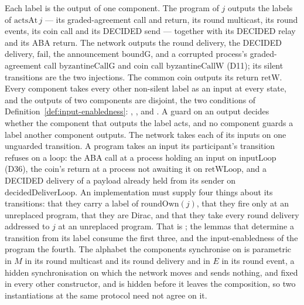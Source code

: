 \begin{definition}
  Each label is the output of one component.
  The program of $j$ outputs the labels of $\mathrm{actsAt}\,j$ --- its graded-agreement call and return, its round multicast, its round events, its coin call and its DECIDED send --- together with its DECIDED relay and its ABA return.
  The network outputs the round delivery, the DECIDED delivery, $\mathrm{fail}$, the announcement $\mathrm{boundG}$, and a corrupted process's graded-agreement call $\mathrm{byzantineCallG}$ and coin call $\mathrm{byzantineCallW}$ (D11); its silent transitions are the two injections.
  The common coin outputs its return $\mathrm{retW}$.
  Every component takes every other non-silent label as an input at every state, and the outputs of two components are disjoint, the two conditions of Definition~\ref{def:input-enabledness}: , ,  and .
  A guard on an output decides whether the component that outputs the label acts, and no component guards a label another component outputs.
  The network takes each of its inputs on one unguarded transition.
  A program takes an input its participant's transition refuses on a loop: the ABA call at a process holding an input on $\mathrm{inputLoop}$ (D36), the coin's return at a process not awaiting it on $\mathrm{retWLoop}$, and a DECIDED delivery of a payload already held from its sender on $\mathrm{decidedDeliverLoop}$.
  An implementation must supply four things about its transitions: that they carry a label of $\mathrm{roundOwn}(j)$, that they fire only at an unreplaced program, that they are Dirac, and that they take every round delivery addressed to $j$ at an unreplaced program.
  That is ; the lemmas that determine a transition from its label consume the first three, and the input-enabledness of the program the fourth.
  The alphabet the components synchronise on is parametric in $M$ in its round multicast and its round delivery and in $E$ in its round event, a hidden synchronisation on which the network moves and sends nothing, and fixed in every other constructor, and is hidden before it leaves the composition, so two instantiations at the same protocol need not agree on it.


\end{definition}

